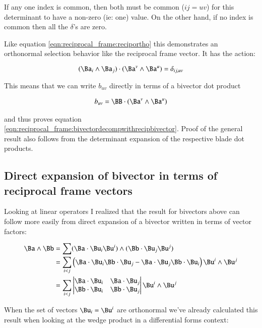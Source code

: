 If any one index is common, then both must be common ($ij=uv$) for this determinant to have a non-zero (ie: one) value.  On the other hand, if no index is common then all the $\delta$'s are zero.

Like 
equation \ref{eqn:reciprocal_frame:reciportho}
this demonstrates an orthonormal selection behavior like the reciprocal frame vector.  It has the action:

\begin{equation}
(\Ba_i \wedge \Ba_j) \cdot (\Ba^v \wedge \Ba^u) = \delta_{ij,uv}
\end{equation}

This means that we can write $b_{uv}$ directly in terms of a bivector dot product

\begin{align*}
b_{uv} = \BB \cdot (\Ba^v \wedge \Ba^u)
\end{align*}

and thus proves equation \ref{eqn:reciprocal_frame:bivectordecompwithrecipbivector}.  Proof of the general result
also follows from the determinant expansion of the respective blade dot products.

\subsection{Direct expansion of bivector in terms of reciprocal frame vectors }

Looking at linear operators I realized that the result for bivectors above can follow more easily from direct expansion of a bivector written in terms of vector factors:

\begin{align*}
\Ba \wedge \Bb
&= \sum (\Ba \cdot \Bu_i \Bu^i) \wedge (\Bb \cdot \Bu_j \Bu^j) \\
&= \sum_{i<j} \left(\Ba \cdot \Bu_i \Bb \cdot \Bu_j - \Ba \cdot \Bu_j \Bb \cdot \Bu_i \right) \Bu^i \wedge \Bu^j \\
&= \sum_{i<j} 
\begin{vmatrix}
\Ba \cdot \Bu_i  & \Ba \cdot \Bu_j  \\
\Bb \cdot \Bu_i & \Bb \cdot \Bu_j  \\
\end{vmatrix}
\Bu^i \wedge \Bu^j \\
\end{align*}

When the set of vectors $\Bu_i = \Bu^i$ are orthonormal we've already
calculated this result when looking at the wedge product in a differential
forms context:

